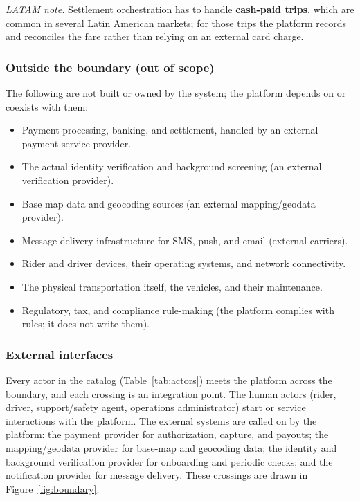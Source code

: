 \noindent\emph{LATAM note.} Settlement orchestration has to handle
\textbf{cash-paid trips}, which are common in several Latin American markets;
for those trips the platform records and reconciles the fare rather than
relying on an external card charge.

\subsubsection*{Outside the boundary (out of scope)}

The following are not built or owned by the system; the platform depends on
or coexists with them:

\begin{itemize}[leftmargin=1.4em,itemsep=0.15em]
  \item Payment processing, banking, and settlement, handled by an external
        payment service provider.
  \item The actual identity verification and background screening (an
        external verification provider).
  \item Base map data and geocoding sources (an external mapping/geodata
        provider).
  \item Message-delivery infrastructure for SMS, push, and email (external
        carriers).
  \item Rider and driver devices, their operating systems, and network
        connectivity.
  \item The physical transportation itself, the vehicles, and their
        maintenance.
  \item Regulatory, tax, and compliance rule-making (the platform complies
        with rules; it does not write them).
\end{itemize}

\subsubsection*{External interfaces}

Every actor in the catalog (Table~\ref{tab:actors}) meets the platform across
the boundary, and each crossing is an integration point. The human actors
(rider, driver, support/safety agent, operations administrator) start or
service interactions with the platform. The external systems are called on by
the platform: the payment provider for authorization, capture, and payouts;
the mapping/geodata provider for base-map and geocoding data; the identity
and background verification provider for onboarding and periodic checks; and
the notification provider for message delivery. These crossings are drawn in
Figure~\ref{fig:boundary}.

